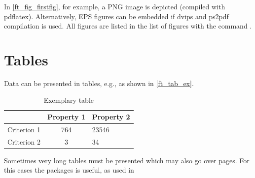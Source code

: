 \documentclass[9pt,a4paper,oneside]{extbook}
\begin{document}
In \autoref{ft_fig_firstfig}, for example, a PNG image is depicted (compiled with pdflatex). Alternatively, EPS figures can be embedded if dvips and ps2pdf compilation is used. All figures are listed in the list of figures with the command .

\section{Tables}

Data can be presented in tables, e.g., as shown in \autoref{ft_tab_ex}.

\begin{table}[!h]
	\centering
	\begin{tabular}{l|cl}
	\hline \hline
	
		& Property 1
		& Property 2\\ \hline
	Criterion 1
		& 764
		& 23546 \\
	Criterion 2
		& 3
		& 34 \\
	\hline \hline
	\end{tabular}
	\caption{Exemplary table}
	\label{ft_tab_ex}
\end{table}

Sometimes very long tables must be presented which may also go over pages. For this cases the packages  is useful, as used in 
\end{document}
